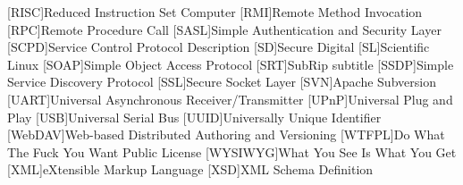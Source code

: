 \begin{acronym}[WYSIWYG]
[RISC]{Reduced Instruction Set Computer}
[RMI]{Remote Method Invocation}
[RPC]{Remote Procedure Call}
[SASL]{Simple Authentication and Security Layer}
[SCPD]{Service Control Protocol Description}
[SD]{Secure Digital}
[SL]{Scientific Linux}
[SOAP]{Simple Object Access Protocol}
[SRT]{SubRip subtitle}
[SSDP]{Simple Service Discovery Protocol}
[SSL]{Secure Socket Layer}
[SVN]{Apache Subversion}
[UART]{Universal Asynchronous Receiver/Transmitter}
[UPnP]{Universal Plug and Play}
[USB]{Universal Serial Bus}
[UUID]{Universally Unique Identifier}
[WebDAV]{Web-based Distributed Authoring and Versioning}
[WTFPL]{Do What The Fuck You Want Public License}
[WYSIWYG]{What You See Is What You Get}
[XML]{eXtensible Markup Language}
[XSD]{XML Schema Definition}
\end{acronym}
